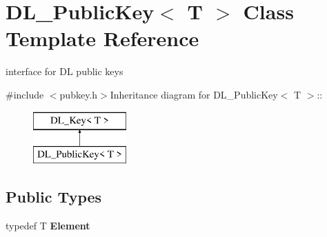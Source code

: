 \hypertarget{class_d_l___public_key}{
\section{DL\_\-PublicKey$<$ T $>$ Class Template Reference}
\label{class_d_l___public_key}
}


interface for DL public keys  


{\ttfamily \#include $<$pubkey.h$>$}Inheritance diagram for DL\_\-PublicKey$<$ T $>$::\begin{figure}[H]
\begin{center}
\leavevmode
\includegraphics[height=2cm]{class_d_l___public_key}
\end{center}
\end{figure}
\subsection*{Public Types}
\begin{DoxyCompactItemize}
\item 
\hypertarget{class_d_l___public_key_a26c192a54ad555f24082894c5f271ebf}{
typedef T {\bfseries Element}}
\label{class_d_l___public_key_a26c192a54ad555f24082894c5f271ebf}

\end{DoxyCompactItemize}

